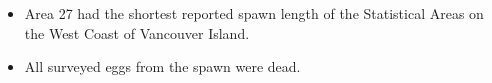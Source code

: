 \begin{itemize}
\item Area 27 had the shortest reported spawn length of the Statistical Areas on the West Coast of Vancouver Island.
\item All surveyed eggs from the spawn were dead.
\end{itemize}